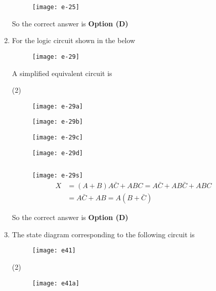 \begin{enumerate}
\begin{answer}
\begin{figure}[H]
	\centering
	\texttt{[image: e-25]}
\end{figure}
So the correct answer is \textbf{Option (D)}
\end{answer}
	\item For the logic circuit shown in the below\\
	\begin{figure}[H]
		\centering
		\texttt{[image: e-29]}
	\end{figure}
	A simplified equivalent circuit is
{	}
\begin{tasks}(2)
\task[\textbf{A.}] 
\begin{figure}[H]
	\centering
	\texttt{[image: e-29a]}
\end{figure}
\task[\textbf{B.}] \begin{figure}[H]
	\centering
	\texttt{[image: e-29b]}
\end{figure}
\task[\textbf{C.}] \begin{figure}[H]
	\centering
	\texttt{[image: e-29c]}
\end{figure}
\task[\textbf{D.}] \begin{figure}[H]
	\centering
	\texttt{[image: e-29d]}
\end{figure}
\end{tasks}
\begin{answer}$\left. \right. $
\begin{figure}[H]
	\centering
	\texttt{[image: e-29s]}
	\begin{align*}
	X&=(A+B) A \bar{C}+A B C=A \bar{C}+A B \bar{C}+A B C\\&=A \bar{C}+A B=A(B+\bar{C})
	\end{align*}
\end{figure}
So the correct answer is \textbf{Option (D)}
\end{answer}
	\item The state diagram corresponding to the following circuit is
{	}
\begin{figure}[H]
\centering
\texttt{[image: e41]}
\end{figure}
\begin{tasks}(2)
\task[\textbf{A.}] \begin{figure}[H]
	\centering
	\texttt{[image: e41a]}

\end{figure}
\end{tasks}
\end{enumerate}
